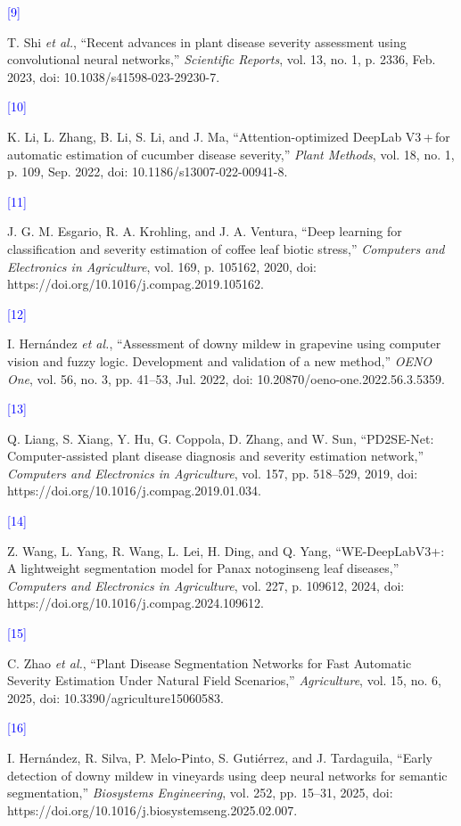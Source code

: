\documentclass[
]{article}
\begin{document}
\hypertarget{ref:9}{\textcolor{blue}{[9]}} T. Shi \emph{et al.}, ``Recent advances in plant disease
severity assessment using convolutional neural networks,''
\emph{Scientific Reports}, vol. 13, no. 1, p. 2336, Feb. 2023, doi:
10.1038/s41598-023-29230-7.

\hypertarget{ref:10}{\textcolor{blue}{[10]}} K. Li, L. Zhang, B. Li, S. Li, and
J. Ma, ``Attention-optimized DeepLab V3\,+\,for automatic estimation of
cucumber disease severity,'' \emph{Plant Methods}, vol. 18, no. 1, p.
109, Sep. 2022, doi: 10.1186/s13007-022-00941-8.

\hypertarget{ref:11}{\textcolor{blue}{[11]}} J. G. M.
Esgario, R. A. Krohling, and J. A. Ventura, ``Deep learning for
classification and severity estimation of coffee leaf biotic stress,''
\emph{Computers and Electronics in Agriculture}, vol. 169, p. 105162,
2020, doi: https://doi.org/10.1016/j.compag.2019.105162.

\hypertarget{ref:12}{\textcolor{blue}{[12]}} I.
Hernández \emph{et al.}, ``Assessment of downy mildew in grapevine using
computer vision and fuzzy logic. Development and validation of a new
method,'' \emph{OENO One}, vol. 56, no. 3, pp. 41--53, Jul. 2022, doi:
10.20870/oeno-one.2022.56.3.5359.

\hypertarget{ref:13}{\textcolor{blue}{[13]}} Q. Liang, S. Xiang, Y. Hu, G.
Coppola, D. Zhang, and W. Sun, ``PD2SE-Net: Computer-assisted plant
disease diagnosis and severity estimation network,'' \emph{Computers and
Electronics in Agriculture}, vol. 157, pp. 518--529, 2019, doi:
https://doi.org/10.1016/j.compag.2019.01.034.

\hypertarget{ref:14}{\textcolor{blue}{[14]}} Z. Wang, L. Yang,
R. Wang, L. Lei, H. Ding, and Q. Yang, ``WE-DeepLabV3+: A lightweight
segmentation model for Panax notoginseng leaf diseases,''
\emph{Computers and Electronics in Agriculture}, vol. 227, p. 109612,
2024, doi: https://doi.org/10.1016/j.compag.2024.109612.

\hypertarget{ref:15}{\textcolor{blue}{[15]}} C. Zhao
\emph{et al.}, ``Plant Disease Segmentation Networks for Fast Automatic
Severity Estimation Under Natural Field Scenarios,'' \emph{Agriculture},
vol. 15, no. 6, 2025, doi: 10.3390/agriculture15060583.

\hypertarget{ref:16}{\textcolor{blue}{[16]}} I.
Hernández, R. Silva, P. Melo-Pinto, S. Gutiérrez, and J. Tardaguila,
``Early detection of downy mildew in vineyards using deep neural
networks for semantic segmentation,'' \emph{Biosystems Engineering},
vol. 252, pp. 15--31, 2025, doi:
https://doi.org/10.1016/j.biosystemseng.2025.02.007.
\end{document}
